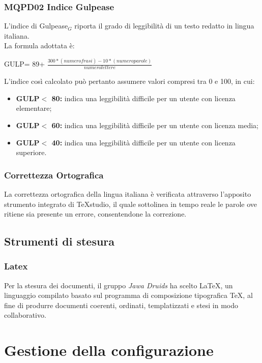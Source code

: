 \subsubsection{MQPD02 Indice Gulpease}\label{ProcessiDiSupportoDocumentazioneMetricheMQPD02IndiceGulpease}
L'indice di Gulpease$_G$ riporta il grado di leggibilità di un testo redatto in lingua italiana.\\
La formula adottata è:
\begin{center}
  GULP= 89+ $\frac{300*(numero frasi)-10*(numero parole)}{numero lettere}$
\end{center}
L'indice così calcolato può pertanto assumere valori compresi tra 0 e 100, in cui:
\begin{itemize}
\item \textbf{GULP$<$ 80:} indica una leggibilità difficile per un utente con licenza elementare;
\item \textbf{GULP$<$ 60:} indica una leggibilità difficile per un utente con licenza media;
\item \textbf{GULP$<$ 40:} indica una leggibilità difficile per un utente con licenza superiore.
\end{itemize}

\subsubsection{Correttezza Ortografica}\label{ProcessiDiSupportoDocumentazioneMetricheCorrettezzaOrtografica}
La correttezza ortografica della lingua italiana è verificata attraverso l'apposito strumento integrato di \TeX studio, il quale sottolinea in tempo reale le parole ove ritiene sia presente un errore, consentendone la correzione.


\subsection{Strumenti di stesura}\label{ProcessiDiSupportoDocumentazioneStrumentiDiStesura}
\subsubsection{Latex}\label{ProcessiDiSupportoDocumentazioneStrumentiDiStesuraLatex}
Per la stesura dei documenti, il gruppo \textit{Jawa Druids} ha scelto \LaTeX, un linguaggio compilato basato sul programma di composizione tipografica \TeX, al fine di produrre documenti coerenti, ordinati, templatizzati e stesi in modo collaborativo.
\section{Gestione della configurazione}\label{ProcessiDiSupportoGestioneDellaConfigurazione}
